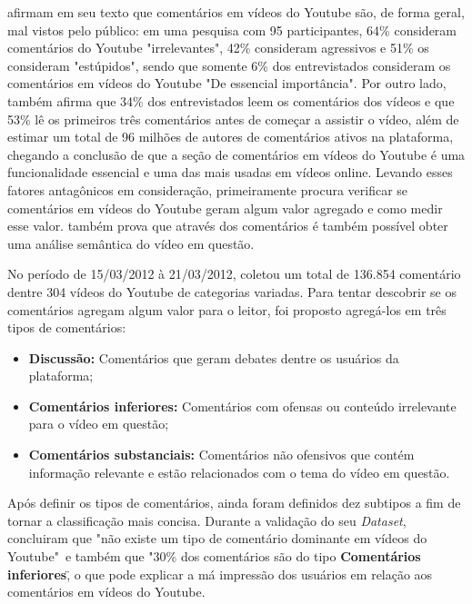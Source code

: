 \cite{schultes2013leave} afirmam em seu texto que comentários em vídeos do Youtube são, de forma geral, mal vistos pelo público: em uma pesquisa com 95 participantes, 64\% consideram comentários do Youtube "irrelevantes", 42\% consideram agressivos e 51\% os consideram "estúpidos", sendo que somente 6\% dos entrevistados consideram os comentários em vídeos do Youtube "De essencial importância". Por outro lado, \cite{schultes2013leave} também afirma que 34\% dos entrevistados leem os comentários dos vídeos e que 53\% lê os primeiros três comentários antes de começar a assistir o vídeo, além de estimar um total de 96 milhões de autores de comentários ativos na plataforma, chegando a conclusão de que a seção de comentários em vídeos do Youtube é uma funcionalidade essencial e uma das mais usadas em vídeos online. Levando esses fatores antagônicos em consideração, \cite{schultes2013leave} primeiramente procura verificar se comentários em vídeos do Youtube geram algum valor agregado e como medir esse valor. \cite{schultes2013leave} também prova que através dos comentários é também possível obter uma análise semântica do vídeo em questão. 

No período de 15/03/2012 à 21/03/2012, \cite{schultes2013leave} coletou um total de 136.854 comentário dentre 304 vídeos do Youtube de categorias variadas. Para tentar descobrir se os comentários agregam algum valor para o leitor, foi proposto agregá-los em três tipos de comentários:
\begin{itemize}
    \item \textbf{Discussão:} Comentários que geram debates dentre os usuários da plataforma;
    \item \textbf{Comentários inferiores:} Comentários com ofensas ou conteúdo irrelevante para o vídeo em questão; 
   \item \textbf{Comentários substanciais:} Comentários não ofensivos que contém informação relevante e estão relacionados com o tema do vídeo em questão.
\end{itemize}
Após definir os tipos de comentários, ainda foram definidos dez subtipos a fim de tornar a classificação mais concisa. %
Durante a validação do seu \textit{Dataset}, \cite{schultes2013leave} concluiram que "não existe um tipo de comentário dominante em vídeos do Youtube"\ e também que "30\% dos comentários são do tipo \textbf{Comentários inferiores}\", o que pode explicar a má impressão dos usuários em relação aos comentários em vídeos do Youtube.


